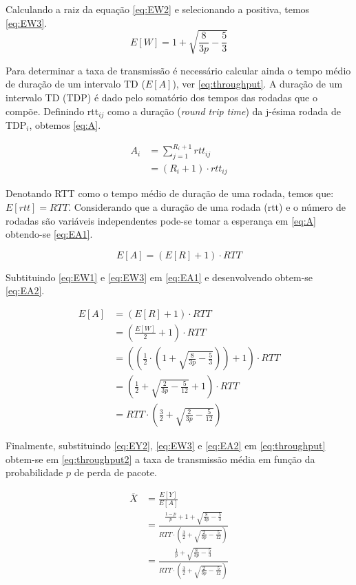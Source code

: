 Calculando a raiz da equação \eqref{eq:EW2} e selecionando a positiva, temos \eqref{eq:EW3}.
\begin{equation} \label{eq:EW3}
E[W] = 1 + \sqrt{\frac{8}{3p} - \frac{5}{3}}
\end{equation}

Para determinar a taxa de transmissão é necessário calcular ainda o tempo médio de duração de um intervalo 
TD ($E[A]$), ver \eqref{eq:throughput}. A duração de um intervalo TD (TDP) é dado pelo somatório dos tempos
das rodadas que o compõe. Definindo rtt$_{ij}$ como a duração (\textit{round trip time}) da j-ésima rodada
de TDP$_i$, obtemos \eqref{eq:A}.

\begin{align} \label{eq:A}
\nonumber A_i &= \sum_{j=1}^{R_i + 1} rtt_{ij} \\
&=(R_i + 1) \cdot  rtt_{ij}
\end{align}

Denotando RTT como o tempo médio de duração de uma rodada, temos que: $E[rtt]=RTT$. Considerando que a duração
de uma rodada (rtt) e o número de rodadas são variáveis independentes pode-se tomar a esperança em \eqref{eq:A}
obtendo-se \eqref{eq:EA1}.

\begin{equation} \label{eq:EA1}
E[A] = (E[R] + 1) \cdot  RTT
\end{equation}

Subtituindo \eqref{eq:EW1} e \eqref{eq:EW3} em \eqref{eq:EA1} e desenvolvendo obtem-se \eqref{eq:EA2}.

\begin{align} \label{eq:EA2}
\nonumber E[A] &= (E[R] + 1) \cdot  RTT \\
\nonumber &= \left(\frac{E[W]}{2} + 1\right) \cdot  RTT \\
\nonumber &= \left(\left(\frac{1}{2} \cdot  \left(1 + \sqrt{\frac{8}{3p} - \frac{5}{3}}\right)\right) + 1\right) \cdot  RTT \\
\nonumber &= \left(\frac{1}{2} + \sqrt{\frac{2}{3p} - \frac{5}{12}} + 1\right) \cdot  RTT \\
&= RTT \cdot  \left(\frac{3}{2} + \sqrt{\frac{2}{3p} - \frac{5}{12}} \right)
\end{align}

Finalmente, substituindo \eqref{eq:EY2}, \eqref{eq:EW3} e \eqref{eq:EA2} em \eqref{eq:throughput} obtem-se em
\eqref{eq:throughput2} a taxa de transmissão média em função da probabilidade $p$ de perda de pacote.

\begin{align} \label{eq:throughput2}
\nonumber \overline{X} &= \frac{E[Y]}{E[A]} \\
\nonumber &=\frac{\frac{1 - p}{p} + 1 + \sqrt{\frac{8}{3p} - \frac{5}{3}}}{RTT \cdot  \left(\frac{3}{2} + \sqrt{\frac{2}{3p} - \frac{5}{12}} \right)} \\
&=\frac{\frac{1}{p} + \sqrt{\frac{8}{3p} - \frac{5}{3}}}{RTT \cdot  \left(\frac{3}{2} + \sqrt{\frac{2}{3p} - \frac{5}{12}} \right)}
\end{align}

